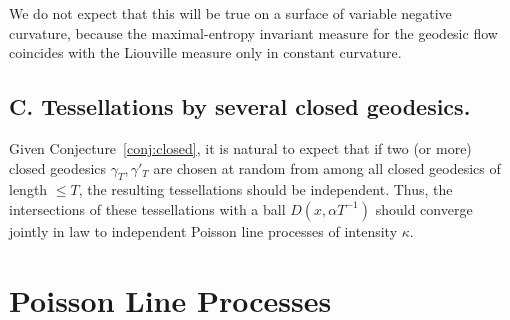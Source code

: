 \documentclass[10pt]{amsart}
\theoremstyle{definition}\newtheorem{defi}[theo]{Definition}\newtheorem{rema}[theo]{Remark}\newtheorem{exam}[theo]{Example}\newtheorem{exem}[theo]{Example}\newtheorem{nota}[theo]{Notation}
\begin{document}
We do not expect that this will be true on a surface of variable negative curvature, because the maximal-entropy invariant measure for the geodesic flow coincides with the Liouville measure only in constant curvature.

\subsection*{C. Tessellations by several closed geodesics.}
Given Conjecture~\ref{conj:closed}, it is natural to expect that if two (or more) closed geodesics $\gamma_{T},\gamma '_{T}$ are chosen at random from among all closed geodesics of length $\leq T$, the resulting tessellations should be independent. Thus, the intersections of these tessellations with a ball $D (x,\alpha T^{-1})$ should converge jointly in law to independent Poisson line processes of intensity $\kappa$.


\appendix{}
\section{Poisson Line Processes}\label{sec:appendix}
\end{document}
